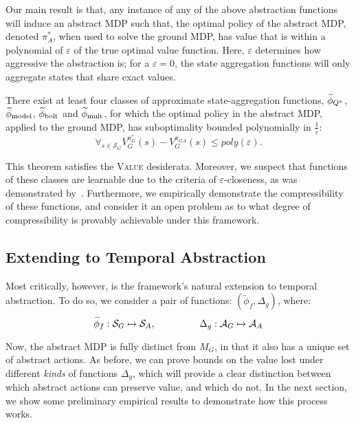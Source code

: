 Our main result is that, any instance of any of the above abstraction functions will induce an abstract \ac{MDP} such that, the optimal policy of the abstract MDP, denoted $\pi_A^*$, when used to solve the ground MDP, has value that is within a polynomial of $\varepsilon$ of the true optimal value function. Here, $\varepsilon$ determines how aggressive the abstraction is; for a $\varepsilon=0$, the state aggregation functions will only aggregate states that share exact values.

\begin{thm}
There exist at least four classes of approximate state-aggregation functions, $\widetilde \phi_{Q^*}$, $\widetilde \phi_{\text{model}}$, $\widetilde \phi_{\text{bolt}}$ and $\widetilde \phi_{\text{mult}}$, for which the optimal policy in the abstract \ac{MDP}, applied to the ground \ac{MDP}, has suboptimality bounded polynomially in $\frac{1}{\varepsilon}$:
\begin{equation}
\forall_{s \in \mathcal{S}_G} V_G^{\pi_G^*}(s) - V_G^{\pi_{GA}}(s) \leq poly \left (\varepsilon \right).
\end{equation}
\end{thm}

This theorem satisfies the \textsc{Value} desiderata. Moreover, we suspect that functions of these classes are learnable due to the criteria of $\varepsilon$-closeness, as was demonstrated by~\cite{ortner2007logarithmic}. Furthermore, we empirically demonstrate the compressibility of these functions, and consider it an open problem as to what degree of compressibility is provably achievable under this framework.

\subsection{Extending to Temporal Abstraction}
Most critically, however, is the framework's natural extension to temporal abstraction. To do so, we consider a pair of functions: $(\widetilde{\phi}_f, \Delta_g)$, where:
\begin{equation}
\widetilde{\phi}_f: \mathcal{S}_G \mapsto \mathcal{S}_A, \hspace{16mm} \Delta_g : \mathcal{A}_G \mapsto \mathcal{A}_A
\end{equation}

Now, the abstract MDP is fully distinct from $M_G$, in that it also has a unique set of abstract actions. As before, we can prove bounds on the value lost under different {\it kinds} of functions $\Delta_g$, which will provide a clear distinction between which abstract actions can preserve value, and which do not. In the next section, we show some preliminary empirical results to demonstrate how this process works.

